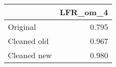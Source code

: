 \begin{tabular}{lr}
\toprule
{} & LFR_om_4 \\
\midrule
Original    &    0.795 \\
Cleaned old &    0.967 \\
Cleaned new &    0.980 \\
\bottomrule
\end{tabular}
